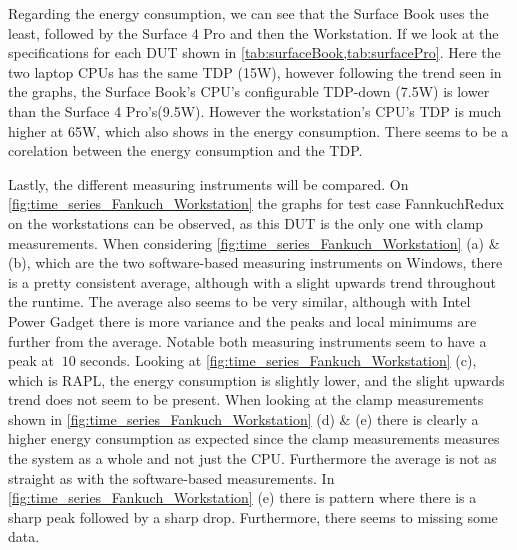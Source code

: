 

Regarding the energy consumption, we can see that the Surface Book uses the least, followed by the Surface 4 Pro and then the Workstation. If we look at the specifications for each DUT shown in \cref{tab:surfaceBook,tab:surfacePro}. Here the two laptop CPUs has the same TDP (15W), however following the trend seen in the graphs, the Surface Book's CPU's configurable TDP-down (7.5W) is lower than the Surface 4 Pro's(9.5W). However the workstation's CPU's TDP is much higher at 65W, which also shows in the energy consumption. There seems to be a corelation between the energy consumption and the TDP.


Lastly, the different measuring instruments will be compared. On \cref{fig:time_series_Fankuch_Workstation} the graphs for test case FannkuchRedux on the workstations can be observed, as this DUT is the only one with clamp measurements. When considering \cref{fig:time_series_Fankuch_Workstation} (a) \& (b), which are the two software-based measuring instruments on Windows, there is a pretty consistent average, although with a slight upwards trend throughout the runtime. The average also seems to be very similar, although with Intel Power Gadget there is more variance and the peaks and local minimums are further from the average. Notable both measuring instruments seem to have a peak at $~10$ seconds. Looking at \cref{fig:time_series_Fankuch_Workstation} (c), which is RAPL, the energy consumption is slightly lower, and the slight upwards trend does not seem to be present. When looking at the clamp measurements shown in \cref{fig:time_series_Fankuch_Workstation} (d) \& (e) there is clearly a higher energy consumption as expected since the clamp measurements measures the system as a whole and not just the CPU. Furthermore the average is not as straight as with the software-based measurements. In \cref{fig:time_series_Fankuch_Workstation} (e) there is pattern where there is a sharp peak followed by a sharp drop. Furthermore, there seems to missing some data.










